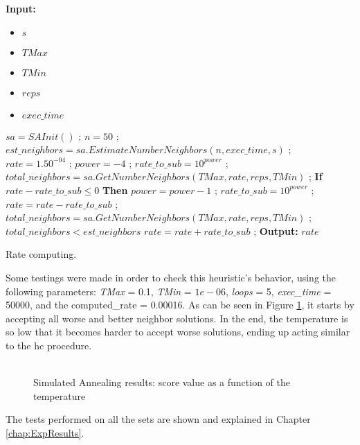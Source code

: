 \begin{algorithm}[t!]
\textbf{Input:} 
\begin{itemize}
	\setlength{\itemsep}{1pt}
	\item $s$ 
	\item $TMax$ 
	\item $TMin$ 
	\item $reps$ 
	\item $exec\_time$ 
\end{itemize}
\begin{algorithmic}
\State $sa = SAInit()$ ;
\State $n = 50$ ; 
\State $est\_neighbors = sa.EstimateNumberNeighbors(n, exec\_time, s)$ ;
\State $rate = 1.50^{-04}$ ;
\State $power = -4$ ;
\State $rate\_to\_sub = 10^{power}$ ;
\State $total\_neighbors = sa.GetNumberNeighbors(TMax, rate, reps, TMin)$ ;
\Repeat	
	\State \textbf{If} $rate - rate\_to\_sub \leq 0$ \textbf{Then} $power = power - 1$ ; $rate\_to\_sub = 10^{power}$ ;
	\State $rate = rate - rate\_to\_sub$ ;
	\State $total\_neighbors = sa.GetNumberNeighbors(TMax, rate, reps, TMin)$ ;
\Until $total\_neighbors < est\_neighbors$
\State $rate = rate + rate\_to\_sub$ ; 
\State \textbf{Output:} $rate$ 
\end{algorithmic}
\caption{Rate computing.}
\label{alg:RateComputing}
\end{algorithm}Some testings were made in order to check this heuristic's behavior, using the following parameters: \textit{TMax} = 0.1, \textit{TMin} = $1e-06$, \textit{loops} = 5, \textit{exec\_time} = 50000, and the computed\_rate = 0.00016. As can be seen in Figure \ref{fig:SimulatedAnnealingPlot}, it starts by accepting all worse and better neighbor solutions. In the end, the temperature is so low that it becomes harder to accept worse solutions, ending up acting similar to the \gls{hc} procedure.\\
\\
\begin{figure}[!t]
\centering


\caption{Simulated Annealing results: score value as a function of the temperature} 
\label{fig:SimulatedAnnealingPlot}
\end{figure}
The tests performed on all the sets are shown and explained in Chapter \ref{chap:ExpResults}.

